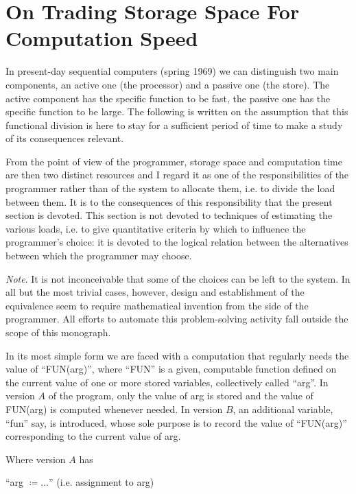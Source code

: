 \section[On trading storage space for computation speed]{On Trading Storage Space For Computation Speed}
\label{sec:trading-storage-for-computation-speed}

In present-day sequential computers (spring 1969) we can distinguish two main components, an active one (the processor) and a passive one (the store). The active component has the specific function to be fast, the passive one has the specific function to be large. The following is written on the assumption that this functional division is here to stay for a sufficient period of time to make a study of its consequences relevant.

From the point of view of the programmer, storage space and computation time are then two distinct resources and I regard it as one of the responsibilities of the programmer \textemdash{}  rather than of the system \textemdash{}  to allocate them, i.e. to divide the load between them. It is to the consequences of this responsibility that the present section is devoted. This section is not devoted to techniques of estimating the various loads, i.e. to give quantitative criteria by which to influence the programmer's choice: it is devoted to the logical relation between the alternatives between which the programmer may choose.

\noindent
\textit{Note}. It is not inconceivable that some of the choices can be left to the system. In all but the most trivial cases, however, design and establishment of the equivalence seem to require mathematical invention from the side of the programmer. All efforts to automate this problem-solving activity fall outside the scope of this monograph.

In its most simple form we are faced with a computation that regularly needs the value of ``FUN(arg)'', where ``FUN'' is a given, computable function defined on the current value of one or more stored variables, collectively called ``arg''. In version $A$ of the program, only the value of arg is stored and the value of FUN(arg) is computed whenever needed. In version $B$, an additional variable, ``fun'' say, is introduced, whose sole purpose is to record the value of ``FUN(arg)'' corresponding to the current value of arg.

Where version $A$ has
\medskip

{
	\setlength{\parindent}{8em}
	\hspace{-.4em}``arg $\coloneq \dots$'' (i.e. assignment to arg)
	
}
\medskip

